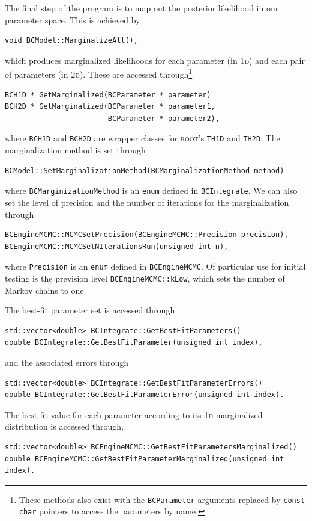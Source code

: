 \documentclass[a4paper,11pt]{article}
\newcommand{\acronym}[1]{\textsc{#1}}
\newcommand{\ROOT}{\acronym{root}}
\newcommand{\xD}[1]{#1\textsc{d}}
\newcommand{\Icode}[1]{\texttt{#1}}
\begin{document}
The final step of the program is to map out the posterior likelihood
in our parameter space. This is achieved by
\begin{verbatim}
void BCModel::MarginalizeAll(),
\end{verbatim}
which produces marginalized likelihoods for each parameter (in \xD{1})
and each pair of parameters (in \xD{2}). These are accessed
through\footnote{These methods also exist with the \Icode{BCParameter}
  arguments replaced by \Icode{const char} pointers to access the
  parameters by name.}
\begin{verbatim}
BCH1D * GetMarginalized(BCParameter * parameter)
BCH2D * GetMarginalized(BCParameter * parameter1,
                        BCParameter * parameter2),
\end{verbatim}
where \Icode{BCH1D} and \Icode{BCH2D} are wrapper classes for \ROOT's
\Icode{TH1D} and \Icode{TH2D}. The marginalization method is set through
\begin{verbatim}
BCModel::SetMarginalizationMethod(BCMarginalizationMethod method)
\end{verbatim}
where \Icode{BCMarginizationMethod} is an \Icode{enum} defined in
\Icode{BCIntegrate}. We can also set the level of precision and the
number of iterations for the marginalization through
\begin{verbatim}
BCEngineMCMC::MCMCSetPrecision(BCEngineMCMC::Precision precision),
BCEngineMCMC::MCMCSetNIterationsRun(unsigned int n),
\end{verbatim}
where \Icode{Precision} is an \Icode{enum} defined in
\Icode{BCEngineMCMC}. Of particular use for initial testing is the
prevision level \Icode{BCEngineMCMC::kLow}, which sets the number of
Markov chains to one.

The best-fit parameter set is accessed through
\begin{verbatim}
std::vector<double> BCIntegrate::GetBestFitParameters()
double BCIntegrate::GetBestFitParameter(unsigned int index),
\end{verbatim}
and the associated errors through
\begin{verbatim}
std::vector<double> BCIntegrate::GetBestFitParameterErrors()
double BCIntegrate::GetBestFitParameterError(unsigned int index).
\end{verbatim}
The best-fit value for each parameter according to its \xD{1}
marginalized distribution is accessed through,
\begin{verbatim}
std::vector<double> BCEngineMCMC::GetBestFitParametersMarginalized()
double BCEngineMCMC::GetBestFitParameterMarginalized(unsigned int index).
\end{verbatim}
\end{document}
